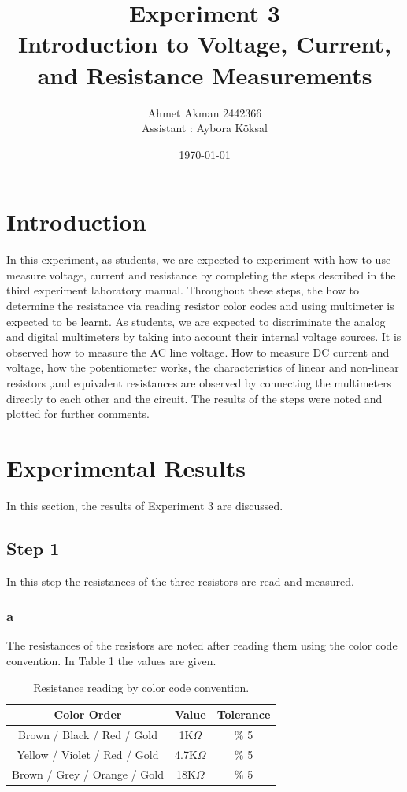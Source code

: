 \documentclass[letterpaper,12pt]{article}
\begin{document}
\title{Experiment 3 \protect\\Introduction to Voltage, Current, and Resistance Measurements}
\author{Ahmet Akman 2442366 \protect\\ Assistant : Aybora Köksal}
\date{\today}
\maketitle



\section{Introduction} 
In this experiment, as students, we are expected to experiment with how to use measure voltage, current and resistance by completing the steps described in the third experiment laboratory manual. Throughout these steps, the how to determine the resistance via reading resistor color codes and using multimeter is expected to be learnt. As students, we are expected to discriminate the analog and digital multimeters by taking into account their internal voltage sources. It is observed how to measure the AC line voltage. How to measure DC current and voltage, how the potentiometer works, the characteristics of linear and non-linear resistors ,and equivalent resistances are observed by connecting the multimeters directly to each other and the circuit. The results of the steps were noted and plotted for further comments.

\section{Experimental Results}
In this section, the results of Experiment 3 are discussed.
\subsection{Step 1}
In this step the resistances of the three resistors are read and measured. 
\subsubsection{a} 
The resistances of the resistors are noted after reading them using the color code convention. In Table 1 the values are given. 
\begin{table}[H]
\begin{center}
	\begin{tabular}{||c | c | c||} 
	 \hline
	 Color Order & Value & Tolerance \\ [0.5ex] 
	 \hline\hline
	 Brown / Black / Red / Gold & 1K\( \Omega \) & \( \% \) 5  \\ 
	 \hline
	 Yellow / Violet / Red / Gold & 4.7K\( \Omega \) & \( \% \) 5   \\
	 \hline
	 Brown / Grey / Orange / Gold & 18K\( \Omega \) & \( \% \) 5  \\ [1ex] 
	 \hline
	\end{tabular}
\end{center}
\caption{Resistance reading by color code convention.}
\end{table}
\end{document}
